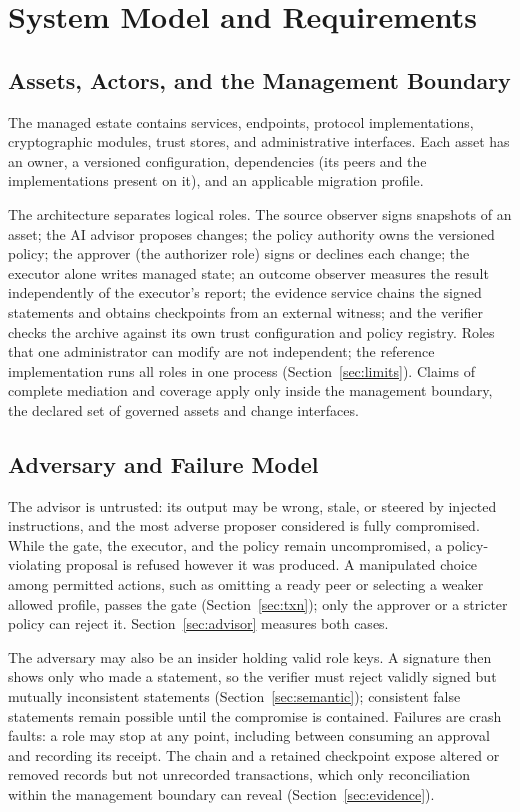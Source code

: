 \section{System Model and Requirements}
\label{sec:model}

\subsection{Assets, Actors, and the Management Boundary}
The managed estate contains services, endpoints, protocol implementations, cryptographic modules, trust stores, and administrative interfaces. Each asset has an owner, a versioned configuration, dependencies (its peers and the implementations present on it), and an applicable migration profile.

The architecture separates logical roles. The source observer signs snapshots of an asset; the AI advisor proposes changes; the policy authority owns the versioned policy; the approver (the authorizer role) signs or declines each change; the executor alone writes managed state; an outcome observer measures the result independently of the executor's report; the evidence service chains the signed statements and obtains checkpoints from an external witness; and the verifier checks the archive against its own trust configuration and policy registry. Roles that one administrator can modify are not independent; the reference implementation runs all roles in one process (Section~\ref{sec:limits}). Claims of complete mediation and coverage apply only inside the management boundary, the declared set of governed assets and change interfaces.

\subsection{Adversary and Failure Model}
The advisor is untrusted: its output may be wrong, stale, or steered by injected instructions, and the most adverse proposer considered is fully compromised. While the gate, the executor, and the policy remain uncompromised, a policy-violating proposal is refused however it was produced. A manipulated choice among permitted actions, such as omitting a ready peer or selecting a weaker allowed profile, passes the gate (Section~\ref{sec:txn}); only the approver or a stricter policy can reject it. Section~\ref{sec:advisor} measures both cases.

The adversary may also be an insider holding valid role keys. A signature then shows only who made a statement, so the verifier must reject validly signed but mutually inconsistent statements (Section~\ref{sec:semantic}); consistent false statements remain possible until the compromise is contained. Failures are crash faults: a role may stop at any point, including between consuming an approval and recording its receipt. The chain and a retained checkpoint expose altered or removed records but not unrecorded transactions, which only reconciliation within the management boundary can reveal (Section~\ref{sec:evidence}).

